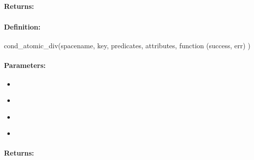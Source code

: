 \paragraph{Returns:}


\pagebreak
\subsubsection{}
\label{api:nodejs:cond_atomic_div}


\paragraph{Definition:}
\begin{javascriptcode}
cond_atomic_div(spacename, key, predicates, attributes, function (success, err) {})
\end{javascriptcode}
\paragraph{Parameters:}
\begin{itemize}[noitemsep]
\item {}\\

\item {}\\

\item {}\\

\item {}\\

\end{itemize}

\paragraph{Returns:}


\pagebreak
\subsubsection{}
\label{api:nodejs:group_atomic_div}



